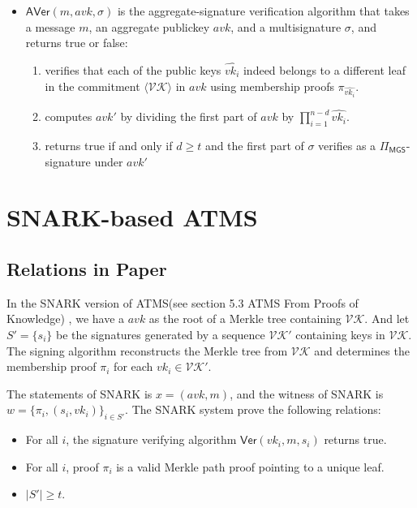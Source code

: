 \documentclass{article}
\begin{document}
\begin{itemize}
    \item $\mathsf{AVer}(m,avk,\sigma)$ is the aggregate-signature verification algorithm that takes a message $m$, an aggregate publickey $avk$, and a multisignature $\sigma$, and returns true or false:
    
    \begin{enumerate}
        \item verifies that each of the public keys $\widehat{vk_i}$ indeed belongs to a different leaf
        in the commitment $\langle \mathcal{VK}\rangle$ in $avk$ using membership proofs $\pi_{\widehat{vk_i}}$.
        \item computes $avk'$ by dividing the first part of $avk$ by $\prod_{i=1}^{n-d} \widehat{vk_i}$.
        \item returns true if and only if $d \geq t$ and the first part of $\sigma$ verifies as a $\Pi_\mathsf{MGS}$-signature
        under $avk'$
    \end{enumerate}

    
\end{itemize}


\section{SNARK-based ATMS}

\subsection{Relations in Paper}
In the SNARK version of ATMS(see section 5.3 ATMS From Proofs of Knowledge) , we have a $avk$ as the root of a Merkle tree containing $\mathcal{VK}$. And let $S' = \{s_i\}$ be the signatures generated by a sequence $\mathcal{VK}'$ containing keys in $\mathcal{VK}$. The signing algorithm reconstructs the Merkle tree from
$\mathcal{VK}$ and determines the membership proof $\pi_i$ for each $vk_i \in \mathcal{VK}'$. 

The statements of SNARK is $x = (avk,m)$, and the witness of SNARK is $w = \{\pi_i, (s_i,vk_i)\}_{i \in S'}$. The SNARK system prove the following relations:
\begin{itemize}
    \item For all $i$, the signature verifying algorithm $\mathsf{Ver}(vk_i,m,s_i)$ returns true.
    \item For all $i$, proof $\pi_i$ is a valid Merkle path proof pointing to a unique leaf.
    \item $|S'| \geq t$.
\end{itemize}
\end{document}
